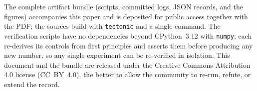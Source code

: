 The complete artifact bundle (scripts, committed logs, JSON records, and
the figures) accompanies this paper and is deposited for public access
together with the PDF; the sources build with \texttt{tectonic} and a
single command. The verification scripts have no dependencies beyond
CPython~3.12 with \texttt{numpy}; each re-derives its controls from
first principles and asserts them before producing any new number, so
any single experiment can be re-verified in isolation. This document and the
bundle are released under the Creative Commons
Attribution 4.0 license (CC~BY~4.0), the better to allow the community
to re-run, refute, or extend the record.
